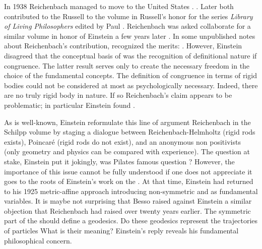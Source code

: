 \documentclass[draft]{article}
\begin{document}

In 1938 Reichenbach managed to move to the United States \citep{Verhaegh2020a}.  . Later both contributed to the Russell to the volume in Russell's honor for the series \textit{Library of Living Philosophers} edited by Paul \citet{Schilpp1944}. Reichenbach was asked collaborate for a similar volume in honor of Einstein a few years later \citep{Schilpp1949}. In some unpublished notes about Reichenbach's contribution, \citet{Einstein1949f} recognized the merits: . However, Einstein disagreed that the conceptual basis of \gr was the recognition of definitional nature if congruence. The latter result serves only to create the necessary freedom in the choice of the fundamental concepts. The definition of congruence in terms of rigid bodies could not be considered at most as psychologically necessary. Indeed, there are no truly rigid body in nature. If so Reichenbach's claim  appears to be problematic; in particular Einstein found . 

As is well-known, Einstein reformulate this line of argument Reichenbach in the Schilpp volume by staging a dialogue between Reichenbach-Helmholtz (rigid rods exists), Poincaré (rigid rods do not exist), and an anonymous non positivists (only geometry and physics can be compared with experience). The question at stake, Einstein put it jokingly, was Pilates famous question ? However, the importance of this issue cannot be fully understood if one does not appreciate it goes to the roots of Einstein's work on the \uft. At that time, Einstein had returned to his 1925 metric-affine approach introducing non-symmetric \gmn and \Gtmn as fundamental variables. It is maybe not surprising that Besso raised against Einstein a similar objection that Reichenbach had raised over twenty years earlier. The symmetric part of the \gmn should define a geodesics. Do these geodesics represent the trajectories of particles What is their meaning? Einstein's reply reveals his fundamental philosophical concern.
\end{document}
